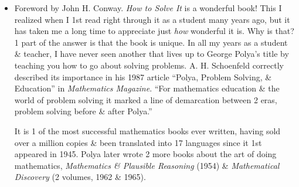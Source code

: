 \documentclass{article}
\begin{document}
\begin{enumerate}
\begin{itemize}
\begin{itemize}
			If you cannot solve the proposed problem try to solve 1st some related problem. Could you imagine a more accessible related problem? A more general problem? A more special problem? An analogous problem? Could you solve a part of the problem? Keep only a part of the condition, drop the other part; how far is the unknown then determined, how can it vary? Could you derive something useful from the data? Could you think of other data appropriate to determine the unknown? Could you change the unknown or the data, or both if necessary, so that the new unknown \& the new data are nearer to each other?

			Did you use all the data? Did you see the whole condition? Have you taken into account all essential notions involved in the problem?
			\item {\sc Carrying out the plan.} 3rd. {\it Carry out} your plan. Carrying out your plan of the solution, {\it check each step}. Can you see clearly that the step is correct? Can you prove that it is correct?
			\item {\sc Looking back}. 4th. {\it Examine} the solution obtained. Can you {\it check the results?} Can you check the argument? Can you derive the result differently? Can you see it at a glance? Can you use the result, or the method, for some other problem?
		\end{itemize}
		\item {\sf Foreword by {\sc John H. Conway}.} {\it How to Solve It} is a wonderful book! This I realized when I 1st read right through it as a student many years ago, but it has taken me a long time to appreciate just {\it how} wonderful it is. Why is that? 1 part of the answer is that the book is unique. In all my years as a student \& teacher, I have never seen another that lives up to {\sc George Polya}'s title by teaching you how to go about solving problems. {\sc A. H. Schoenfeld} correctly described its importance in his 1987 article ``{\sc Polya}, Problem Solving, \& Education'' in {\it Mathematics Magazine}. ``For mathematics education \& the world of problem solving it marked a line of demarcation between 2 eras, problem solving before \& after {\sc Polya}.''

		It is 1 of the most successful mathematics books ever written, having sold over a million copies \& been translated into 17 languages since it 1st appeared in 1945. {\sc Polya} later wrote 2 more books about the art of doing mathematics, {\it Mathematics \& Plausible Reasoning} (1954) \& {\it Mathematical Discovery} (2 volumes, 1962 \& 1965).


\end{itemize}
\end{enumerate}
\end{document}
